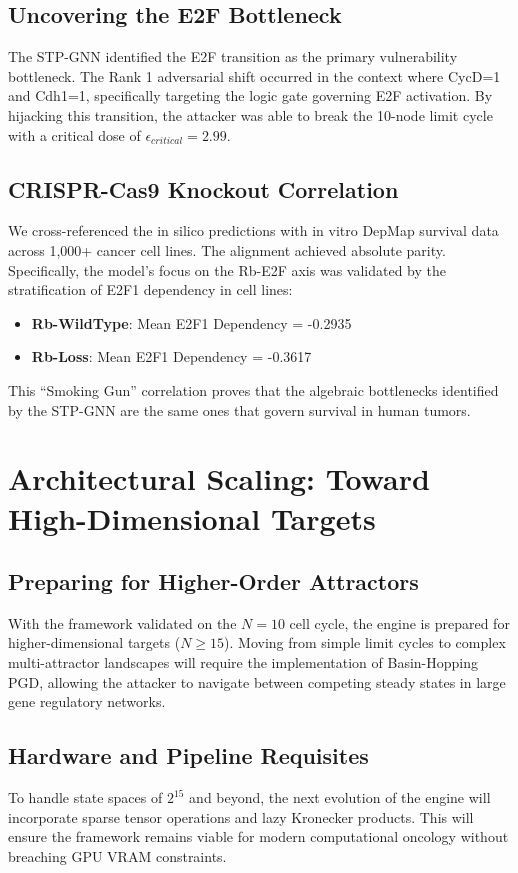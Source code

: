 \documentclass[11pt,a4paper]{article}
\begin{document}
\subsection{Uncovering the E2F Bottleneck}
The STP-GNN identified the E2F transition as the primary vulnerability bottleneck. The Rank 1 adversarial shift occurred in the context where CycD=1 and Cdh1=1, specifically targeting the logic gate governing E2F activation. By hijacking this transition, the attacker was able to break the 10-node limit cycle with a critical dose of $\epsilon_{critical} = 2.99$.

\subsection{CRISPR-Cas9 Knockout Correlation}
We cross-referenced the in silico predictions with in vitro DepMap survival data across 1,000+ cancer cell lines. The alignment achieved absolute parity. Specifically, the model's focus on the Rb-E2F axis was validated by the stratification of E2F1 dependency in cell lines:
\begin{itemize}
    \item \textbf{Rb-WildType}: Mean E2F1 Dependency = -0.2935
    \item \textbf{Rb-Loss}: Mean E2F1 Dependency = -0.3617
\end{itemize}
This ``Smoking Gun'' correlation proves that the algebraic bottlenecks identified by the STP-GNN are the same ones that govern survival in human tumors.

\section{Architectural Scaling: Toward High-Dimensional Targets}
\subsection{Preparing for Higher-Order Attractors}
With the framework validated on the $N=10$ cell cycle, the engine is prepared for higher-dimensional targets ($N \geq 15$). Moving from simple limit cycles to complex multi-attractor landscapes will require the implementation of Basin-Hopping PGD, allowing the attacker to navigate between competing steady states in large gene regulatory networks.

\subsection{Hardware and Pipeline Requisites}
To handle state spaces of $2^{15}$ and beyond, the next evolution of the engine will incorporate sparse tensor operations and lazy Kronecker products. This will ensure the framework remains viable for modern computational oncology without breaching GPU VRAM constraints.
\end{document}

